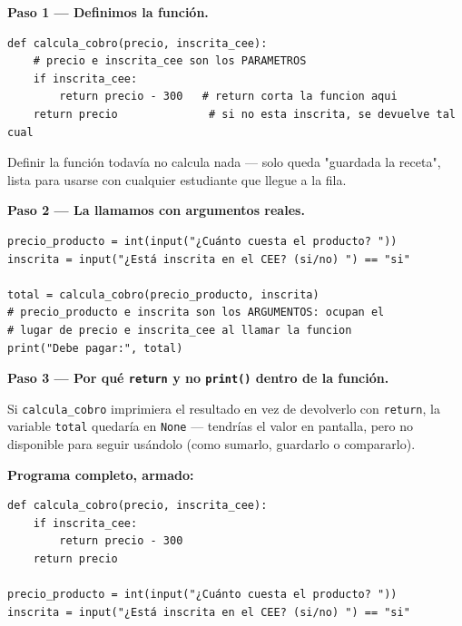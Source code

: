\documentclass[11pt]{article}
\begin{document}
\begin{estrategiabox}

\textbf{Paso 1 --- Definimos la función.}

\begin{cajacodigo}
\begin{Verbatim}[fontsize=\small]
def calcula_cobro(precio, inscrita_cee):
    # precio e inscrita_cee son los PARAMETROS
    if inscrita_cee:
        return precio - 300   # return corta la funcion aqui
    return precio              # si no esta inscrita, se devuelve tal cual
\end{Verbatim}
\end{cajacodigo}
Definir la función todavía no calcula nada --- solo queda "guardada la receta", lista para usarse con cualquier estudiante que llegue a la fila.

\vspace{2mm}
\textbf{Paso 2 --- La llamamos con argumentos reales.}

\begin{cajacodigo}
\begin{Verbatim}[fontsize=\small]
precio_producto = int(input("¿Cuánto cuesta el producto? "))
inscrita = input("¿Está inscrita en el CEE? (si/no) ") == "si"

total = calcula_cobro(precio_producto, inscrita)
# precio_producto e inscrita son los ARGUMENTOS: ocupan el
# lugar de precio e inscrita_cee al llamar la funcion
print("Debe pagar:", total)
\end{Verbatim}
\end{cajacodigo}

\vspace{2mm}
\textbf{Paso 3 --- Por qué \texttt{return} y no \texttt{print()} dentro de la función.}

Si \texttt{calcula\_cobro} imprimiera el resultado en vez de devolverlo con \texttt{return}, la variable \texttt{total} quedaría en \texttt{None} --- tendrías el valor en pantalla, pero no disponible para seguir usándolo (como sumarlo, guardarlo o compararlo).

\vspace{2mm}
\textbf{Programa completo, armado:}

\begin{cajacodigo}
\begin{Verbatim}[fontsize=\small]
def calcula_cobro(precio, inscrita_cee):
    if inscrita_cee:
        return precio - 300
    return precio

precio_producto = int(input("¿Cuánto cuesta el producto? "))
inscrita = input("¿Está inscrita en el CEE? (si/no) ") == "si"


\end{Verbatim}
\end{cajacodigo}
\end{estrategiabox}
\end{document}
